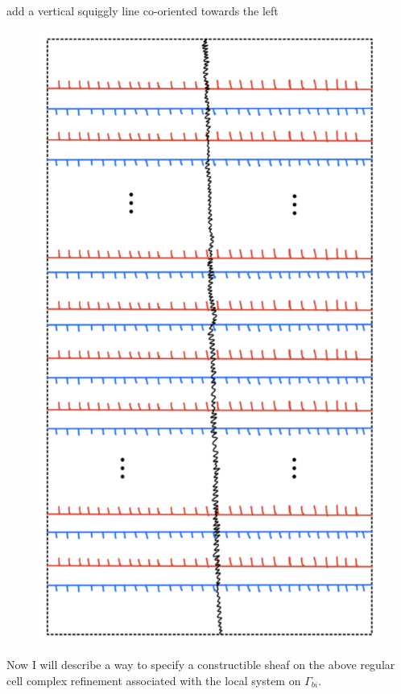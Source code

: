 add a vertical squiggly line co-oriented towards the left
\begin{figure}[H] 
    \centering
    \includegraphics[scale = 0.95]{diagrams/local_systems_on_as_diagrams/15.png} 
    \caption{}
    \label{fig:your-label}
\end{figure}


Now I will describe a way to specify a constructible sheaf on the above regular cell complex refinement associated with the local system on $\Gamma_{bi}$. 

